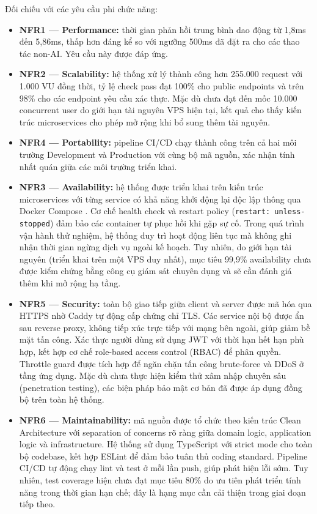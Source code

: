 \noindent Đối chiếu với các yêu cầu phi chức năng:

\begin{itemize}
    \item \textbf{NFR1 --- Performance:} thời gian phản hồi trung bình dao động từ 1,8ms đến 5,86ms, thấp hơn đáng kể so với ngưỡng 500ms đã đặt ra cho các thao tác non-AI. Yêu cầu này được đáp ứng.
    \item \textbf{NFR2 --- Scalability:} hệ thống xử lý thành công hơn 255.000 request với 1.000 VU đồng thời, tỷ lệ check pass đạt 100\% cho public endpoints và trên 98\% cho các endpoint yêu cầu xác thực. Mặc dù chưa đạt đến mốc 10.000 concurrent user do giới hạn tài nguyên VPS hiện tại, kết quả cho thấy kiến trúc microservices cho phép mở rộng khi bổ sung thêm tài nguyên.
    \item \textbf{NFR4 --- Portability:} pipeline CI/CD chạy thành công trên cả hai môi trường Development và Production với cùng bộ mã nguồn, xác nhận tính nhất quán giữa các môi trường triển khai.
    \item \textbf{NFR3 --- Availability:} hệ thống được triển khai trên kiến trúc microservices \cite{microservices_newman} với từng service có khả năng khởi động lại độc lập thông qua Docker Compose \cite{dockercompose}. Cơ chế health check và restart policy (\texttt{restart: unless-stopped}) đảm bảo các container tự phục hồi khi gặp sự cố. Trong quá trình vận hành thử nghiệm, hệ thống duy trì hoạt động liên tục mà không ghi nhận thời gian ngừng dịch vụ ngoài kế hoạch. Tuy nhiên, do giới hạn tài nguyên (triển khai trên một VPS duy nhất), mục tiêu 99,9\% availability chưa được kiểm chứng bằng công cụ giám sát chuyên dụng và sẽ cần đánh giá thêm khi mở rộng hạ tầng.
    \item \textbf{NFR5 --- Security:} toàn bộ giao tiếp giữa client và server được mã hóa qua HTTPS nhờ Caddy \cite{caddy_docs} tự động cấp chứng chỉ TLS. Các service nội bộ được ẩn sau reverse proxy, không tiếp xúc trực tiếp với mạng bên ngoài, giúp giảm bề mặt tấn công. Xác thực người dùng sử dụng JWT với thời hạn hết hạn phù hợp, kết hợp cơ chế role-based access control (RBAC) để phân quyền. Throttle guard được tích hợp để ngăn chặn tấn công brute-force và DDoS ở tầng ứng dụng. Mặc dù chưa thực hiện kiểm thử xâm nhập chuyên sâu (penetration testing), các biện pháp bảo mật cơ bản đã được áp dụng đồng bộ trên toàn hệ thống.
    \item \textbf{NFR6 --- Maintainability:} mã nguồn được tổ chức theo kiến trúc Clean Architecture \cite{clean_architecture} với separation of concerns rõ ràng giữa domain logic, application logic và infrastructure. Hệ thống sử dụng TypeScript với strict mode cho toàn bộ codebase, kết hợp ESLint để đảm bảo tuân thủ coding standard. Pipeline CI/CD tự động chạy lint và test ở mỗi lần push, giúp phát hiện lỗi sớm. Tuy nhiên, test coverage hiện chưa đạt mục tiêu 80\% do ưu tiên phát triển tính năng trong thời gian hạn chế; đây là hạng mục cần cải thiện trong giai đoạn tiếp theo.
\end{itemize}

